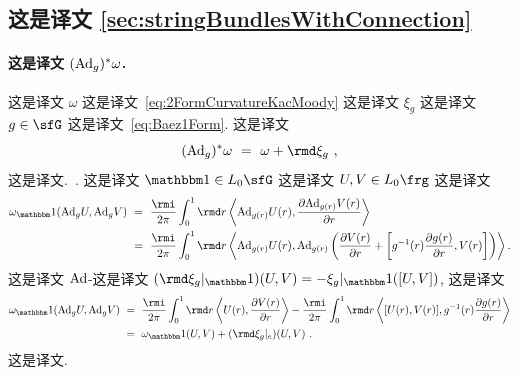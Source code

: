 \documentclass[
    affil-it, %
    auth-lg, %
    british, %
    compression, %
    contents, %
    custom-packages={}, %
    references={bigone}, %
]{lib/preprint}
\begin{document}
\begin{body}
        \section{这是译文 \texorpdfstring{\cref{sec:stringBundlesWithConnection}}{Section 4}}\label{app:proofs}
        
        \paragraph{这是译文 $(\mathrm{Ad}_g)^* \omega$.}
 这是译文 $\omega$ 这是译文~\eqref{eq:2FormCurvatureKacMoody} 这是译文 $\xi_g$ 这是译文 $g\in\sfG$ 这是译文~\eqref{eq:Baez1Form}. 这是译文 
        \begin{equation}
            (\Ad_g)^* \omega\ =\ \omega+\rmd\xi_g~,
        \end{equation}  这是译文.~\cite[Equation (4.6.6)]{Pressley:1988qk}. 这是译文 $\unit\in L_0\sfG$ 这是译文 $U,V\in L_0\frg$ 这是译文         \begin{equation}
            \begin{aligned}
                \omega_\unit(\Ad_gU,\Ad_gV)\ &=\ \frac{\rmi}{2\pi}\int_0^1\rmd r\innerLarge{\Ad_{g(r)}U(r)}{\parder[\Ad_{g(r)}V(r)]{r}}
                \\ 
                &=\ \frac{\rmi}{2\pi}\int_0^1\rmd r\innerLarge{\Ad_{g(r)}U(r)}{\Ad_{g(r)}\left(\parder[V(r)]{r}+\left[g^{-1}(r)\parder[g(r)]{r},V(r)\right]\right)}.
            \end{aligned}
        \end{equation}  这是译文 $\mathrm{Ad}$-这是译文 $(\rmd\xi_g|_\unit)(U,V)=-\xi_g|_\unit([U,V])$, 这是译文         \begin{equation}
            \begin{aligned}
                \omega_\unit(\Ad_gU,\Ad_gV)\ &=\ \frac{\rmi}{2\pi}\int_0^1\rmd r\innerLarge{U(r)}{\parder[V(r)]{r}}-\frac{\rmi}{2\pi}\int_0^1\rmd r\innerLarge{[U(r),V(r)]}{g^{-1}(r)\parder[g(r)]{r}}
                \\
                &=\ \omega_\unit(U,V)+(\rmd\xi_g|_e)(U,V)~.
            \end{aligned}
        \end{equation}  这是译文.
        

\end{body}
\end{document}
